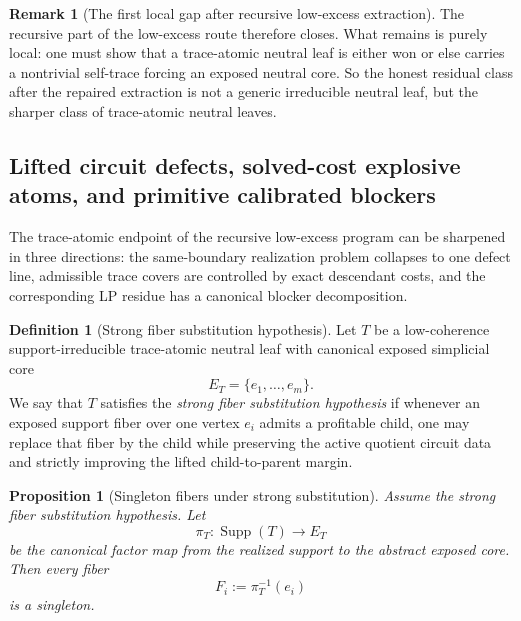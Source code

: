 \documentclass[11pt]{article}
\newtheorem{proposition}[theorem]{Proposition}
\theoremstyle{definition}
\newtheorem{definition}[theorem]{Definition}
\newtheorem{remark}[theorem]{Remark}
\newcommand{\1}{\mathbf{1}}
\begin{document}
\begin{remark}[The first local gap after recursive low-excess extraction]\label{rem:trace-atomic-gap}
The recursive part of the low-excess route therefore closes.
What remains is purely local:
one must show that a trace-atomic neutral leaf is either won or else carries a nontrivial self-trace forcing an exposed neutral core.
So the honest residual class after the repaired extraction is not a generic irreducible neutral leaf, but the sharper class of trace-atomic neutral leaves.
\end{remark}



\subsection*{Lifted circuit defects, solved-cost explosive atoms, and primitive calibrated blockers}
The trace-atomic endpoint of the recursive low-excess program can be sharpened in three directions: the same-boundary realization problem collapses to one defect line, admissible trace covers are controlled by exact descendant costs, and the corresponding LP residue has a canonical blocker decomposition.

\begin{definition}[Strong fiber substitution hypothesis]\label{def:strong-fiber-substitution}
Let $T$ be a low-coherence support-irreducible trace-atomic neutral leaf with canonical exposed simplicial core
\[
E_T=\{e_1,\dots,e_m\}.
\]
We say that $T$ satisfies the \emph{strong fiber substitution hypothesis} if whenever an exposed support fiber over one vertex $e_i$ admits a profitable child, one may replace that fiber by the child while preserving the active quotient circuit data and strictly improving the lifted child-to-parent margin.
\end{definition}

\begin{proposition}[Singleton fibers under strong substitution]\label{prop:singleton-fibers}
Assume the strong fiber substitution hypothesis. Let
\[
\pi_T:\operatorname{Supp}(T)\longrightarrow E_T
\]
be the canonical factor map from the realized support to the abstract exposed core. Then every fiber
\[
F_i:=\pi_T^{-1}(e_i)
\]
is a singleton.
\end{proposition}
\end{document}
